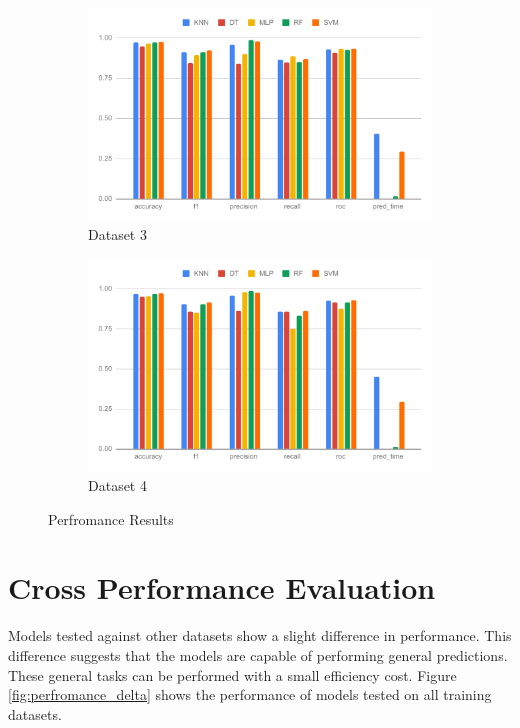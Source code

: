 \begin{figure}[H]
\begin{subfigure}{.5\columnwidth}
        \centering
        \includegraphics[width=0.9\columnwidth]{media/data/performance/perf_ds_3.pdf}
        \caption{Dataset 3}
        \label{fig:perfromance_results_dataset_3}
    \end{subfigure}%
    \begin{subfigure}{.5\columnwidth}
        \centering
        \includegraphics[width=0.9\columnwidth]{media/data/performance/perf_ds_4.pdf}
        \caption{Dataset 4}
        \label{fig:perfromance_results_dataset_4}
    \end{subfigure}
    \caption{Perfromance Results}
    \label{fig:perfromance_results}
\end{figure}

\section{Cross Performance Evaluation} \label{sec:cross_performance_evaluation}

Models tested against other datasets show a slight difference in performance. This difference
suggests that the models are capable of performing general predictions. These general tasks can
be performed with a small efficiency cost. Figure \ref{fig:perfromance_delta} shows the
performance of models tested on all training datasets.

